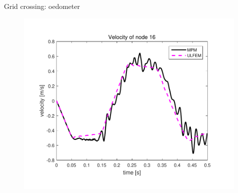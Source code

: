 \documentclass[mathserif,professionalfont,hyperref={pdfpagelabels=false}]{beamer}
\begin{document}

\begin{frame}{Grid crossing: oedometer}
\begin{figure}
\includegraphics[scale=0.5]{images/oedometer_vel_30_10}
\end{figure}
\end{frame}
\end{document}
